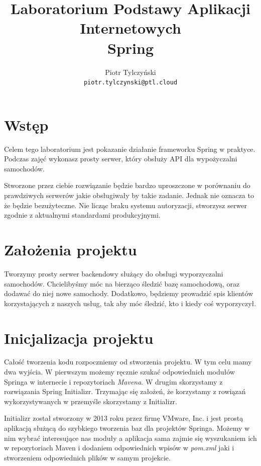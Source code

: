 \documentclass{article}
\begin{document}
    \title{Laboratorium Podstawy Aplikacji Internetowych \\
    Spring}
    \author{Piotr Tylczyński \\
    \texttt{piotr.tylczynski@ptl.cloud}}
    
    \begin{titlepage}
        \maketitle
    \end{titlepage}
    
    \tableofcontents
    \pagebreak
    
    \section{Wstęp}
    Celem tego laboratorium jest pokazanie działanie frameworku Spring w praktyce. Podczas zajęć wykonasz prosty serwer, który obsłuży API dla wypożyczalni samochodów. 
    
    Stworzone przez ciebie rozwiązanie będzie bardzo uproszczone w porównaniu do prawdziwych serwerów jakie obsługiwały by takie zadanie. Jednak nie oznacza to że będzie bezużyteczne. Nie licząc braku systemu autoryzacji, stworzysz serwer zgodnie z aktualnymi standardami produkcyjnymi.
    
    \section{Założenia projektu}
        Tworzymy prosty serwer backendowy służący do obsługi wyporzyczalni samochodów. Chcielibyśmy móc na bierząco śledzić bazę samochodową, oraz dodawać do niej nowe samochody. Dodatkowo, będziemy prowadzić spis klientów korzystających z naszych usług, tak aby móc śledzić, kto i kiedy coś wyporzyczył.
    
    \section{Inicjalizacja projektu}
        Całość tworzenia kodu rozpoczniemy od stworzenia projektu. W tym celu mamy dwa wyjścia. W pierwszym możemy ręcznie szukać odpowiednich modułów Springa w internecie i repozytoriach \emph{Mavena}. W drugim skorzystamy z rozwiązania Spring Initializr. Trzymając się założeń, że korzystamy z rowiązań wykorzystywanych w przemyśle skorzystamy z Initializr. 
        
        Initializr został stworzony w 2013 roku przez firmę VMware, Inc. i jest prostą aplikacją służącą do szybkiego tworzenia baz dla projektów Springa. Możemy w nim wybrać interesujące nas moduły a aplikacja sama zajmie się wyszukaniem ich w repozytoriach Maven i dodaniem odpowiednich wpisów w \emph{pom.xml} jaki i stworzeniem odpowiednich plików w samym projekcie. 
        
\end{document}
